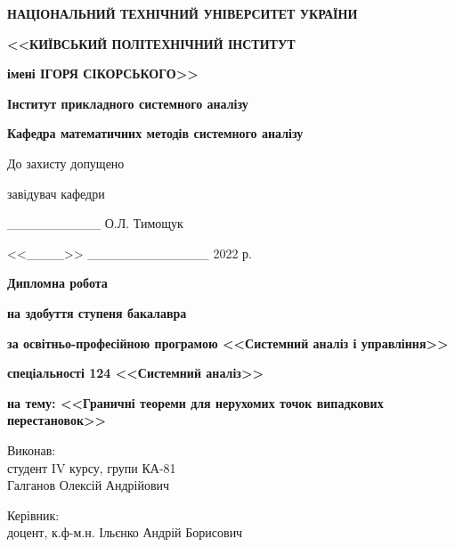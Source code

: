 \thispagestyle{empty}
\begin{center}
    {
        \textbf{НАЦІОНАЛЬНИЙ ТЕХНІЧНИЙ УНІВЕРСИТЕТ УКРАЇНИ}

        \textbf{<<КИЇВСЬКИЙ ПОЛІТЕХНІЧНИЙ ІНСТИТУТ}
        
        \textbf{імені ІГОРЯ СІКОРСЬКОГО>>}
        
        \textbf{Інститут прикладного системного аналізу}
        
        \textbf{Кафедра математичних методів системного аналізу}

    }
\end{center}

\begin{flushright}
    {
        До захисту допущено

        завідувач кафедри

        \_\_\_\_\_\_\_\_\_\_ О.Л. Тимощук

        <<\_\_\_\_>> \_\_\_\_\_\_\_\_\_\_\_\_\_ 2022 р.
    
    }
\end{flushright}
\vspace{5mm}

\begin{center}
    \textbf{\Large Дипломна робота}
    \vspace{7mm}
    {
    
        \textbf{на здобуття ступеня бакалавра}

        \textbf{за освітньо-професійною програмою <<Системний аналіз і управління>>}

        \textbf{спеціальності 124 <<Системний аналіз>>}

        \textbf{на тему: <<Граничні теореми для нерухомих точок випадкових перестановок>>}
    
    }
\end{center}
\vspace{15mm}


\begin{flushleft}
    {
        Виконав:\\
        студент IV курсу, групи КА-81\\
        Галганов Олексій Андрійович
    
    }

    \vspace{5mm}
    {
        Керівник:\\
        доцент, к.ф-м.н. Ільєнко Андрій Борисович
    
    }
\end{flushleft}


